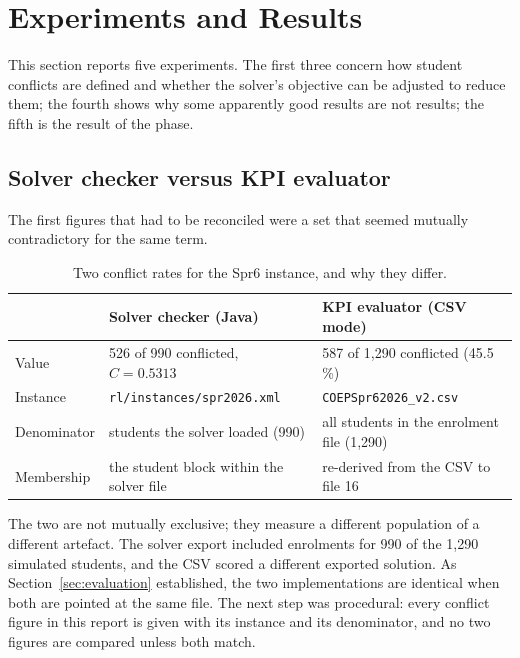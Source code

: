 \section{Experiments and Results}
\label{sec:experiments}

This section reports five experiments. The first three concern how student conflicts are defined
and whether the solver's objective can be adjusted to reduce them; the fourth shows why some
apparently good results are not results; the fifth is the result of the phase.

\subsection{Solver checker versus KPI evaluator}

The first figures that had to be reconciled were a set that seemed mutually contradictory for the
same term.

\begin{table}[H]
\centering
\caption{Two conflict rates for the Spr6 instance, and why they differ.}
\label{tab:reconcile}
\footnotesize
\begin{tabular}{@{}L{3.2cm}L{5.6cm}L{5.6cm}@{}}
\toprule
 & \textbf{Solver checker (Java)} & \textbf{KPI evaluator (CSV mode)} \\
\midrule
Value          & 526 of 990 conflicted, $C = 0.5313$ & 587 of 1{,}290 conflicted (45.5\,\%) \\
Instance       & \texttt{rl/instances/spr2026.xml} & \texttt{COEPSpr62026\_v2.csv} \\
Denominator    & students the solver loaded (990)  & all students in the enrolment file (1{,}290) \\
Membership     & the student block within the solver file & re-derived from the CSV to file 16 \\
\bottomrule
\end{tabular}
\end{table}

The two are not mutually exclusive; they measure a different population of a different artefact.
The solver export included enrolments for 990 of the 1{,}290 simulated students, and the CSV scored
a different exported solution. As Section~\ref{sec:evaluation} established, the two implementations
are identical when both are pointed at the same file. The next step was procedural: every conflict
figure in this report is given with its instance and its denominator, and no two figures are
compared unless both match.

